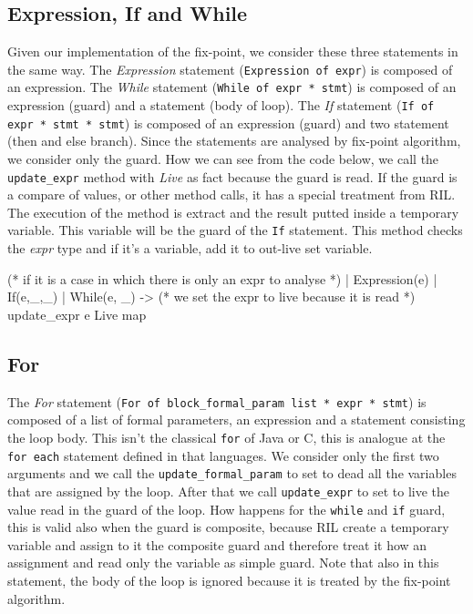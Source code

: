 \documentclass[a4paper]{article}   %
\begin{document}
\subsection{Expression, If and While}
Given our implementation of the fix-point, we consider these three statements in the same way.
The \emph{Expression} statement (\texttt{Expression of expr}) is composed of an expression.
The \emph{While} statement (\texttt{While of expr * stmt}) is composed of an expression (guard) and a statement (body of loop).
The \emph{If} statement (\texttt{If of expr * stmt * stmt}) is composed of an expression (guard) and two statement (then and else branch). %
Since the statements are analysed by fix-point algorithm, we consider only the guard.
How we can see from the code below, we call the \texttt{update\_expr} method with \emph{Live} as fact because the guard is read. 
If the guard is a compare of values, or other method calls, it has a special treatment from RIL. The execution of the method is extract and the result putted inside a temporary variable. This variable will be the guard of the \texttt{If} statement. 
This method checks the \emph{expr} type and if it's a variable, add it to out-live set variable.

\begin{ocaml}
(* if it is a case in which there is only an expr to analyse *)
| Expression(e)
| If(e,_,_)
| While(e, _) -> 
    (* we set the expr to live because it is read *)
    update_expr e Live map
\end{ocaml}

\subsection{For}
The \emph{For} statement (\texttt{For of block\_formal\_param list * expr * stmt}) is composed of a list of formal parameters, an expression and a statement consisting the loop body.
This isn't the classical \texttt{for} of Java or C, this is analogue at the \texttt{for each} statement defined in that languages.
We consider only the first two arguments and we call the \texttt{update\_formal\_param} to set to dead all the variables that are assigned by the loop. After that we call \texttt{update\_expr} to set to live the value read in the guard of the loop.
How happens for the \texttt{while} and \texttt{if} guard, this is valid also when the guard is composite, because RIL create a temporary variable and assign to it the composite guard and therefore treat it how an assignment and read only the variable as simple guard.
Note that also in this statement, the body of the loop is ignored because it is treated by the fix-point algorithm.
\end{document}

